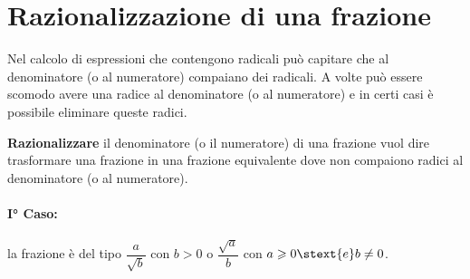 % 

\section{Razionalizzazione di una frazione}
\label{sec:radicali_razionalizzazione}

Nel calcolo di espressioni che contengono radicali può capitare che al 
denominatore (o al numeratore) compaiano dei radicali. 
A volte può essere scomodo avere una radice al denominatore (o al 
numeratore) e in certi casi è possibile eliminare queste radici.

\begin{definizione}{}{}
\textbf{Razionalizzare} il denominatore (o il numeratore) di una
frazione vuol dire trasformare una frazione in una frazione equivalente
dove non compaiono radici al denominatore (o al numeratore).
\end{definizione}



\paragraph{I° Caso:} la frazione è del tipo 
\(\dfrac {a}{\sqrt{b}}\) con \(b > 0\) \quad o \quad 
\(\dfrac {\sqrt{a}}{b}\) con \(a \geqslant 0 \stext{e} b \neq 0\).


